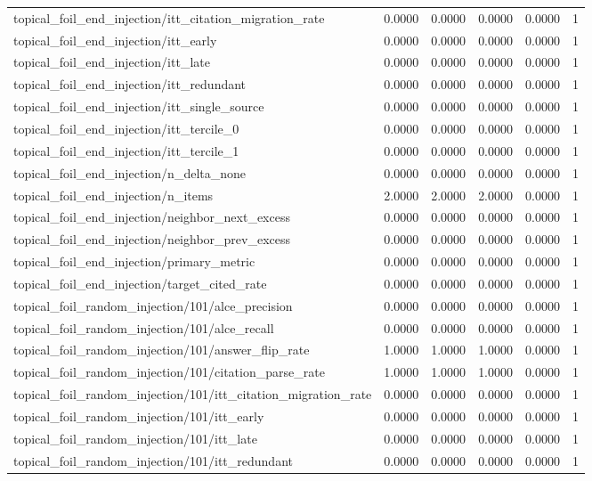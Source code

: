 \begin{table}[h]
\begin{tabular}{lrrrrr}
topical_foil_end_injection/itt_citation_migration_rate & 0.0000 & 0.0000 & 0.0000 & 0.0000 & 1 \\
topical_foil_end_injection/itt_early & 0.0000 & 0.0000 & 0.0000 & 0.0000 & 1 \\
topical_foil_end_injection/itt_late & 0.0000 & 0.0000 & 0.0000 & 0.0000 & 1 \\
topical_foil_end_injection/itt_redundant & 0.0000 & 0.0000 & 0.0000 & 0.0000 & 1 \\
topical_foil_end_injection/itt_single_source & 0.0000 & 0.0000 & 0.0000 & 0.0000 & 1 \\
topical_foil_end_injection/itt_tercile_0 & 0.0000 & 0.0000 & 0.0000 & 0.0000 & 1 \\
topical_foil_end_injection/itt_tercile_1 & 0.0000 & 0.0000 & 0.0000 & 0.0000 & 1 \\
topical_foil_end_injection/n_delta_none & 0.0000 & 0.0000 & 0.0000 & 0.0000 & 1 \\
topical_foil_end_injection/n_items & 2.0000 & 2.0000 & 2.0000 & 0.0000 & 1 \\
topical_foil_end_injection/neighbor_next_excess & 0.0000 & 0.0000 & 0.0000 & 0.0000 & 1 \\
topical_foil_end_injection/neighbor_prev_excess & 0.0000 & 0.0000 & 0.0000 & 0.0000 & 1 \\
topical_foil_end_injection/primary_metric & 0.0000 & 0.0000 & 0.0000 & 0.0000 & 1 \\
topical_foil_end_injection/target_cited_rate & 0.0000 & 0.0000 & 0.0000 & 0.0000 & 1 \\
topical_foil_random_injection/101/alce_precision & 0.0000 & 0.0000 & 0.0000 & 0.0000 & 1 \\
topical_foil_random_injection/101/alce_recall & 0.0000 & 0.0000 & 0.0000 & 0.0000 & 1 \\
topical_foil_random_injection/101/answer_flip_rate & 1.0000 & 1.0000 & 1.0000 & 0.0000 & 1 \\
topical_foil_random_injection/101/citation_parse_rate & 1.0000 & 1.0000 & 1.0000 & 0.0000 & 1 \\
topical_foil_random_injection/101/itt_citation_migration_rate & 0.0000 & 0.0000 & 0.0000 & 0.0000 & 1 \\
topical_foil_random_injection/101/itt_early & 0.0000 & 0.0000 & 0.0000 & 0.0000 & 1 \\
topical_foil_random_injection/101/itt_late & 0.0000 & 0.0000 & 0.0000 & 0.0000 & 1 \\
topical_foil_random_injection/101/itt_redundant & 0.0000 & 0.0000 & 0.0000 & 0.0000 & 1 \\

\end{tabular}
\end{table}
